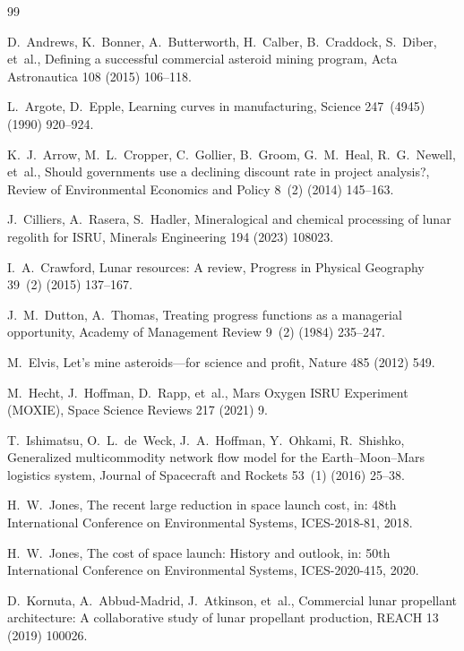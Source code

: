 \documentclass[preprint,12pt]{elsarticle}
\begin{document}
\begin{thebibliography}{99}

D.~Andrews, K.~Bonner, A.~Butterworth, H.~Calber, B.~Craddock, S.~Diber, et~al.,
\newblock Defining a successful commercial asteroid mining program,
\newblock Acta Astronautica 108 (2015) 106--118.

L.~Argote, D.~Epple,
\newblock Learning curves in manufacturing,
\newblock Science 247~(4945) (1990) 920--924.

K.~J.~Arrow, M.~L.~Cropper, C.~Gollier, B.~Groom, G.~M.~Heal, R.~G.~Newell, et~al.,
\newblock Should governments use a declining discount rate in project analysis?,
\newblock Review of Environmental Economics and Policy 8~(2) (2014) 145--163.

J.~Cilliers, A.~Rasera, S.~Hadler,
\newblock Mineralogical and chemical processing of lunar regolith for ISRU,
\newblock Minerals Engineering 194 (2023) 108023.

I.~A.~Crawford,
\newblock Lunar resources: A review,
\newblock Progress in Physical Geography 39~(2) (2015) 137--167.

J.~M.~Dutton, A.~Thomas,
\newblock Treating progress functions as a managerial opportunity,
\newblock Academy of Management Review 9~(2) (1984) 235--247.

M.~Elvis,
\newblock Let's mine asteroids---for science and profit,
\newblock Nature 485 (2012) 549.

M.~Hecht, J.~Hoffman, D.~Rapp, et~al.,
\newblock Mars Oxygen ISRU Experiment (MOXIE),
\newblock Space Science Reviews 217 (2021) 9.

T.~Ishimatsu, O.~L.~de~Weck, J.~A.~Hoffman, Y.~Ohkami, R.~Shishko,
\newblock Generalized multicommodity network flow model for the Earth--Moon--Mars logistics system,
\newblock Journal of Spacecraft and Rockets 53~(1) (2016) 25--38.

H.~W.~Jones,
\newblock The recent large reduction in space launch cost,
\newblock in: 48th International Conference on Environmental Systems, ICES-2018-81, 2018.

H.~W.~Jones,
\newblock The cost of space launch: History and outlook,
\newblock in: 50th International Conference on Environmental Systems, ICES-2020-415, 2020.

D.~Kornuta, A.~Abbud-Madrid, J.~Atkinson, et~al.,
\newblock Commercial lunar propellant architecture: A collaborative study of lunar propellant production,
\newblock REACH 13 (2019) 100026.


\end{thebibliography}
\end{document}
